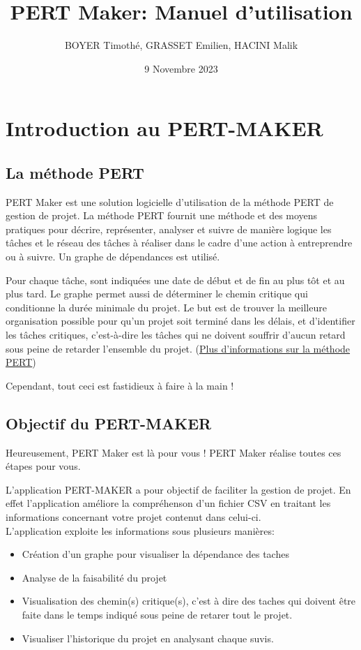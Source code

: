 \documentclass{article}
\title{\centering PERT Maker: Manuel d'utilisation}
\author{BOYER Timothé, GRASSET Emilien, HACINI Malik}
\date{9 Novembre 2023}
\begin{document}
    
    
\maketitle
\tableofcontents{}
\newpage

\section{Introduction au PERT-MAKER}
\subsection{La méthode PERT}
PERT Maker est une solution logicielle d'utilisation de la méthode PERT de gestion de projet.
La méthode PERT fournit une méthode et des moyens pratiques pour décrire,
représenter, analyser et suivre de manière logique les tâches et le réseau des tâches à réaliser dans le cadre d'une 
action à entreprendre ou à suivre.
Un graphe de dépendances est utilisé. 

Pour chaque tâche, sont indiquées une date de début et de fin au plus tôt et au plus tard. 
Le graphe permet aussi de déterminer le chemin critique qui conditionne la durée minimale du projet.
Le but est de trouver la meilleure organisation possible pour qu'un projet soit terminé dans les délais, et d'identifier les tâches critiques, 
c'est-à-dire les tâches qui ne doivent souffrir d'aucun retard sous peine de retarder l'ensemble du projet.
(\href{https://fr.wikipedia.org/wiki/PERT}{Plus d'informations sur la méthode PERT})

Cependant, tout ceci est fastidieux à faire à la main !


\subsection{Objectif du PERT-MAKER}
Heureusement, PERT Maker est là pour vous !
PERT Maker réalise toutes ces étapes pour vous.


L'application PERT-MAKER a pour objectif de faciliter la gestion de projet. En effet l'application améliore la compréhenson d'un fichier CSV en traitant les informations concernant votre projet contenut dans celui-ci.
\\
L'application exploite les informations sous plusieurs manières:
\begin{itemize}
    \item Création d'un graphe pour visualiser la dépendance des taches
    \item Analyse de la faisabilité du projet
    \item Visualisation des chemin(s) critique(s), c'est à dire des taches qui doivent être faite dans le temps indiqué sous peine de retarer tout le projet.
    \item Visualiser l'historique du projet en analysant chaque suvis.
\end{itemize}
\end{document}
